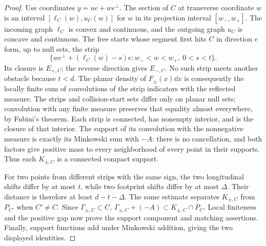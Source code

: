 \begin{proof}
Use coordinates $y=ue+w e^\perp$.  The section of $C$ at transverse
coordinate $w$ is an interval $[\ell_C(w),u_C(w)]$ for
$w$ in its projection interval $[w_-,w_+]$.
The incoming graph $\ell_C$ is convex and continuous, and the
outgoing graph $u_C$ is concave and continuous.  The free starts
whose segment first hits $C$ in direction $e$ form, up to null
sets, the strip
\[
 \{we^\perp+(\ell_C(w)-s)e:
                         w_-<w<w_+,\ 0<s<t\}.
\]
Its closure is $E_{+,C}$; the reverse direction gives $E_{-,C}$.
No such strip meets another obstacle because $t<d$.
The planar density of $F_\pm(x)\dd x$ is consequently the locally
finite sum of convolutions of the strip indicators with the
reflected measure.  The strips and collision-start sets differ
only on planar null sets; convolution with any finite measure
preserves that equality almost everywhere, by Fubini's theorem.
Each strip is connected, has nonempty interior, and is the
closure of that interior.  The support of its convolution with
the nonnegative measure is exactly its Minkowski sum with $-A$:
there is no cancellation, and both factors give positive mass
to every neighborhood of every point in their supports.
Thus each $K_{\pm,C}$ is a connected compact support.

For two points from different strips with the same sign, the
two longitudinal shifts differ by at most $t$, while two
footprint shifts differ by at most $\Delta$.  Their distance is
therefore at least $d-t-\Delta$.  The same estimate separates
$K_{\pm,C}$ from $P_{C'}$ when $C'\ne C$.
Since $\Gamma_{\pm,C}\subset C$,
$\Gamma_{\pm,C}+(-A)\subset K_{\pm,C}\cap P_C$.
Local finiteness and the positive gap now prove the support
component and matching assertions.  Finally, support functions
add under Minkowski addition, giving the two displayed identities.
\end{proof}

